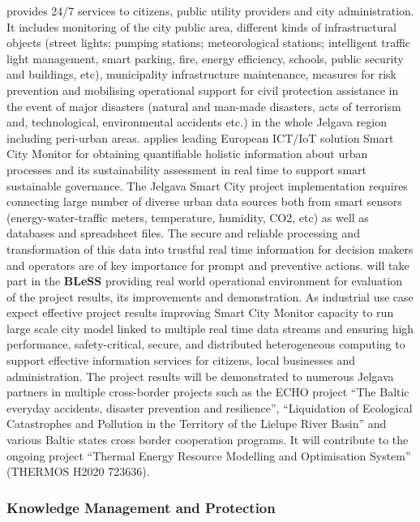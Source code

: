 \documentclass[a4paper,11pt]{article}
\newcommand{\project}[1]{\textbf{#1}\xspace}
\newcommand{\BLESS}{\project{BLeSS}}
\newcommand{\TheProject}{\BLESS}
\begin{document}
\JMOIClong
 provides 24/7 services to citizens, public utility providers and city
administration. It includes monitoring of the city public area, different
kinds of infrastructural objects (street lights; pumping stations;
meteorological stations; intelligent traffic light management, smart
parking, fire, energy efficiency, schools, public security and buildings,
etc), municipality infrastructure maintenance, measures for risk
prevention and mobilising operational support for civil protection
assistance in the event of major disasters (natural and man-made
disasters, acts of terrorism and, technological, environmental accidents
etc.) in the whole Jelgava region including peri-urban areas.  \JMOIC
applies leading European ICT/IoT solution Smart City Monitor for
obtaining quantifiable holistic information about urban processes and its
sustainability assessment in real time to support smart sustainable
governance. The Jelgava Smart City project implementation requires
connecting large number of diverse urban data sources both from smart
sensors (energy-water-traffic meters, temperature, humidity, CO2, etc) as
well as databases and spreadsheet files. The secure and reliable
processing and transformation of this data into trustful real time
information for decision makers and \JMOIC operators are of key importance
for prompt and preventive actions.  \JMOIC will take part in the
\TheProject{} providing real world operational environment for evaluation
of the project results, its improvements and demonstration. As industrial
use case \JMOIC expect effective project results improving Smart City
Monitor capacity to run large scale city model linked to multiple real
time data streams and ensuring high performance, safety-critical, secure,
and distributed heterogeneous computing to support effective information
services for citizens, local businesses and administration.  The project
results will be demonstrated to numerous Jelgava partners in multiple
cross-border projects such as the {ECHO} project ``The Baltic everyday
accidents, disaster prevention and resilience'', ``Liquidation of
Ecological Catastrophes and Pollution in the Territory of the Lielupe
River Basin'' and various Baltic states cross border cooperation
programs. It will contribute to the ongoing project ``Thermal Energy
Resource Modelling and Optimisation System'' (THERMOS H2020 723636).

\horizontalline


\subsubsection{Knowledge Management and Protection}
\vspace{-12pt}
\end{document}
